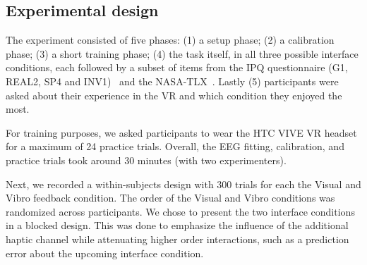 \subsection{Experimental design}
The experiment consisted of five phases: (1) a setup phase; (2) a calibration phase; (3) a short training phase; (4) the task itself, in all three possible interface conditions, each followed by a subset of items from the IPQ questionnaire (G1, REAL2, SP4 and INV1)~\cite{Schubert2003-sq} and the NASA-TLX~\cite{Hart1988-iw}. Lastly (5) participants were asked about their experience in the VR and which condition they enjoyed the most.

For training purposes, we asked participants to wear the HTC VIVE VR headset for a maximum of 24 practice trials. Overall, the EEG fitting, calibration, and practice trials took around 30 minutes (with two experimenters). 

Next, we recorded a within-subjects design with 300 trials for each the Visual and Vibro feedback condition. The order of the Visual and Vibro conditions was randomized across participants. \textcolor{n}{We chose to present the two interface conditions in a blocked design. This was done to emphasize the influence of the additional haptic channel while attenuating higher order interactions, such as a prediction error about the upcoming interface condition.}




